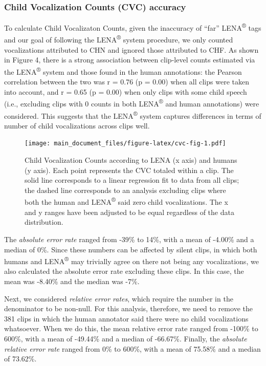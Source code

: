 \documentclass[english,table,man,floatsintext]{apa6}
\begin{document}
\hypertarget{child-vocalization-counts-cvc-accuracy}{%
\subsubsection{Child Vocalization Counts (CVC) accuracy}\label{child-vocalization-counts-cvc-accuracy}}

To calculate Child Vocalizaton Counts, given the inaccuracy of \enquote{far} LENA\textsuperscript{®} tags and our goal of following the LENA\textsuperscript{®} system procedure, we only counted vocalizations attributed to CHN and ignored those attributed to CHF. As shown in Figure 4, there is a strong association between clip-level counts estimated via the LENA\textsuperscript{®} system and those found in the human annotations: the Pearson correlation between the two was r = 0.76 (p = 0.00) when all clips were taken into account, and r = 0.65 (p = 0.00) when only clips with some child speech (i.e., excluding clips with 0 counts in both LENA\textsuperscript{®} and human annotations) were considered. This suggests that the LENA\textsuperscript{®} system captures differences in terms of number of child vocalizations across clips well.

\begin{figure}
\centering
\texttt{[image: main\_document\_files/figure-latex/cvc-fig-1.pdf]}
\caption{\label{fig:cvc-fig}Child Vocalization Counts according to LENA (x axis) and humans (y axis). Each point represents the CVC totaled within a clip. The solid line corresponds to a linear regression fit to data from all clips; the dashed line corresponds to an analysis excluding clips where both the human and LENA\textsuperscript{®} said zero child vocalizations. The x and y ranges have been adjusted to be equal regardless of the data distribution.}
\end{figure}

The \emph{absolute error rate} ranged from -39\% to 14\%, with a mean of -4.00\% and a median of 0\%. Since these numbers can be affected by silent clips, in which both humans and LENA\textsuperscript{®} may trivially agree on there not being any vocalizations, we also calculated the absolute error rate excluding these clips. In this case,
the mean was -8.40\% and the median was -7\%.

Next, we considered \emph{relative error rates}, which require the number in the denominator to be non-null. For this analysis, therefore, we need to remove the 381 clips in which the human annotator said there were no child vocalizations whatsoever. When we do this, the mean relative error rate ranged from -100\% to 600\%, with a mean of -49.44\% and a median of -66.67\%. Finally, the \emph{absolute relative error rate} ranged from 0\% to 600\%, with a mean of 75.58\% and a median of 73.62\%.
\end{document}
